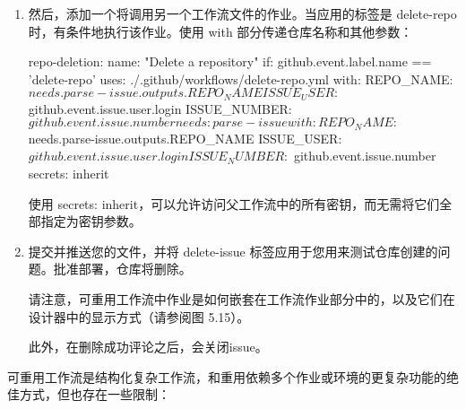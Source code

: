 \begin{enumerate}
\begin{shell}
jobs:
  parse-issue:
    runs-on: ubuntu-latest
    outputs:
      REPO_NAME: ${{ steps.repo-request.outputs.REPO_NAME }}
    steps:
      - name: Issue Forms Body Parser
        id: parse
        uses: zentered/issue-forms-body-parser@v2.0.0
      - name: Repository Request Validation
        id: repo-request
        env:
          GH_TOKEN: ${{ github.token }}
        run: |
          repo_name=$(echo '${{ steps.parse.outputs.data }}' | jq -r '.name.text')
          repo_dept=$(echo '${{ steps.parse.outputs.data }}' | jq -r '.department.text')
          repo_full_name=$repo_dept-$repo_name
          echo "REPO_NAME=$repo_full_name" >> "$GITHUB_OUTPUT"
\end{shell}

\item 
然后，添加一个将调用另一个工作流文件的作业。当应用的标签是 delete-repo 时，有条件地执行该作业。使用 with 部分传递仓库名称和其他参数：

\begin{shell}
repo-deletion:
  name: "Delete a repository"
  if: github.event.label.name == 'delete-repo'
  uses: ./.github/workflows/delete-repo.yml
  with:
    REPO_NAME: ${{ needs.parse-issue.outputs.REPO_NAME }}
    ISSUE_USER: ${{ github.event.issue.user.login }}
    ISSUE_NUMBER: ${{ github.event.issue.number }}
    needs: parse-issue
  with:
    REPO_NAME: ${{ needs.parse-issue.outputs.REPO_NAME }}
    ISSUE_USER: ${{ github.event.issue.user.login }}
    ISSUE_NUMBER: ${{ github.event.issue.number }}
  secrets: inherit
\end{shell}

使用 secrets: inherit，可以允许访问父工作流中的所有密钥，而无需将它们全部指定为密钥参数。

\item 
提交并推送您的文件，并将 delete-issue 标签应用于您用来测试仓库创建的问题。批准部署，仓库将删除。

请注意，可重用工作流中作业是如何嵌套在工作流作业部分中的，以及它们在设计器中的显示方式（请参阅图 5.15）。


此外，在删除成功评论之后，会关闭issue。

\end{enumerate}


可重用工作流是结构化复杂工作流，和重用依赖多个作业或环境的更复杂功能的绝佳方式，但也存在一些限制：

